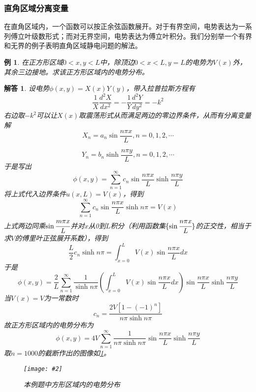 \documentclass[a4paper,11pt]{ctexbook}
\newcommand{\cpic}[2]{
\begin{center}
\texttt{[image: \#2]}
\end{center}
}
\newcommand{\cpicn}[3]
{
\begin{figure}[H]
\cpic{#1}{#2}
\caption{#3\label{#2}}
\end{figure}
}
\newtheorem{eg}{例}[section]
\newtheorem{ans}{解答}[section]
\newcommand{\beq}{\begin{equation}}
\newcommand{\eeq}{\end{equation}}
\begin{document}
\subsubsection{直角区域分离变量}
在直角区域内，一个函数可以按正余弦函数展开。对于有界空间，电势表达为一系列傅立叶级数形式；而对无界空间，电势表达为傅立叶积分。我们分别举一个有界和无界的例子表明直角区域静电问题的解法。\begin{eg}
在正方形区域$0<x,y<L$中，除顶边$0<x<L, y=L$的电势为$V(x)$外，其余三边接地。求该正方形区域内的电势分布。
\end{eg}
\begin{ans}
设电势$\phi( x,y) = X(x) Y(y)$，带入拉普拉斯方程有
\beq
\frac{1}{X} \frac{d^2 X}{d x^2} = - \frac{1}{Y} \frac{d^2 Y}{dy^2} = -k^2
\eeq
右边取$-k^2$可以让$X(x)$取震荡形式从而满足两边的零边界条件，从而有分离变量解
\begin{equation}
X_n = a_n \sin \frac{n\pi x}{L}, n=0,1,2,\cdots
\end{equation}

\begin{equation}
Y_n = b_n \sinh \frac{n\pi y}{L}, n=0,1,2,\cdots
\end{equation}
于是写出
\begin{equation}
\phi(x,y) = \sum_{n=1}^\infty c_n \sin \frac{n\pi x}{L} \sinh \frac{n\pi y}{L}
\end{equation}
将上式代入边界条件$u(x,L) =V(x)$，得到
\begin{equation}
\sum_{n=1}^\infty c_n \sin \frac{n\pi x}{L} \sinh n\pi = V(x)
\end{equation}
上式两边同乘$\sin \cfrac{m\pi x}{L}$并对$x$从0到$L$积分（利用函数集$\{ \sin \cfrac{n \pi x}{L}\}$的正交性，相当于求$V$的傅里叶正弦展开系数），得到
\beq
\frac{L}{2}  c_n \sinh n \pi=  \int_{x=0}^L V(x) \sin \frac{n \pi x}{L} dx
\eeq
于是
\beq
\phi(x,y) = \frac{2}{L} \sum_{n=1}^\infty \frac{1}{\sinh n \pi}  \left( \int_{x=0}^L V(x) \sin \frac{n \pi x}{L} dx \right)
\sin \frac{n\pi x}{L} \sinh \frac{n\pi y }{L}
\eeq
当$V(x)=V$为一常数时
\begin{equation}
c_n = \frac{2V[1-(-1)^n]}{n\pi \sinh n \pi} \end{equation}
故正方形区域内的电势分布为
\begin{equation}
\phi(x,y) = 4V\sum_{n=1}^{\infty} \frac{1}{n\pi \sinh n \pi}  \sin \frac{n\pi x}{L} \sinh \frac{n\pi y}{L}
\end{equation}
取$n=1000$的截断作出的图像如\cref{es2}。
\cpicn{0.4}{es2}{本例题中方形区域内的电势分布}
\end{ans}
\par
\end{document}
